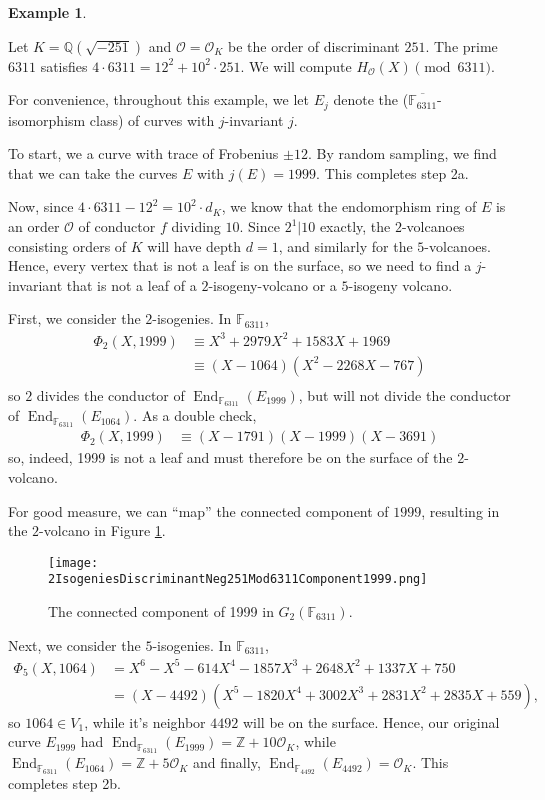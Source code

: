 \documentclass{amsart}
\theoremstyle{definition}
\newtheorem{example}[thm]{Example}
\theoremstyle{remark}
\numberwithin{equation}{section}
\newcommand{\cO}{\mathcal O}
\newcommand{\bbF}{\mathbb F}
\newcommand{\bbQ}{\mathbb Q}
\newcommand{\bbZ}{\mathbb Z}
\DeclareMathOperator{\End}{End}
\begin{document}
\begin{example} \label{ex:ComputingHilbertPoly}

Let $K = \bbQ(\sqrt{-251})$ and $\cO = \cO_{K}$ be the order of discriminant $251$. The prime $6311$ satisfies $4 \cdot 6311 = 12^2 + 10^2 \cdot 251$. We will compute $H_{\cO}(X) \pmod{6311}$. 

For convenience, throughout this example, we let $E_{j}$ denote the ($\overline{\bbF_{6311}}$-isomorphism class) of curves with $j$-invariant $j$.

 To start, we a curve with trace of Frobenius $\pm 12$. By random sampling, we find that we can take the curves $E$ with $j(E) = 1999$. This completes step 2a.

Now, since $4\cdot 6311 - 12^2 = 10^2 \cdot d_{K}$, we know that the endomorphism ring of $E$ is an order $\cO$ of conductor $f$ dividing $10$. Since $2^1|10$ exactly, the $2$-volcanoes consisting orders of $K$ will have depth $d = 1$, and similarly for the $5$-volcanoes. Hence, every vertex that is not a leaf is on the surface, so we need to find a $j$-invariant that is not a leaf of a $2$-isogeny-volcano or a $5$-isogeny volcano.

First, we consider the $2$-isogenies. In $\bbF_{6311}$,
\begin{align*}
\Phi_{2}(X, 1999) & \equiv X^3 + 2979 X^2 + 1583 X + 1969 \\
                  & \equiv (X - 1064)   (X^2 - 2268 X - 767) \\
\end{align*}
so $2$ divides the conductor of $\End_{\bbF_{6311}}(E_{1999})$, but will not divide the conductor of $\End_{\bbF_{6311}}(E_{1064})$. As a double check,
\begin{align*}
\Phi_{2}(X, 1999) & \equiv (X - 1791) (X - 1999) (X - 3691)
\end{align*}
so, indeed, 1999 is not a leaf and must therefore be on the surface of the $2$-volcano.

For good measure, we can ``map'' the connected component of $1999$, resulting in the $2$-volcano in Figure \ref{fig:2VolcanoForExample}.

\begin{figure} \label{fig:2VolcanoForExample}
 \centering
 \texttt{[image: 2IsogeniesDiscriminantNeg251Mod6311Component1999.png]}  %
  \caption{The connected component of 1999 in $G_{2}(\bbF_{6311})$.}
 \end{figure}

Next, we consider the $5$-isogenies. In $\bbF_{6311}$,
\begin{align*}
\Phi_{5}(X, 1064) & = X^6 - X^5 - 614 X^4 - 1857 X^3 + 2648 X^2 + 1337 X + 750 \\
                  & = (X - 4492)   (X^5 - 1820 X^4 + 3002 X^3 + 2831 X^2 + 2835 X + 559),
\end{align*}
so $1064 \in V_1$, while it's neighbor $4492$ will be on the surface. Hence, our original curve $E_{1999}$ had $\End_{\bbF_{6311}}(E_{1999}) = \bbZ + 10 \cO_{K}$, while $\End_{\bbF_{6311}}(E_{1064}) = \bbZ + 5 \cO_{K}$ and finally, $\End_{\bbF_{4492}}(E_{4492}) = \cO_{K}$. This completes step 2b.


\end{example}
\end{document}
